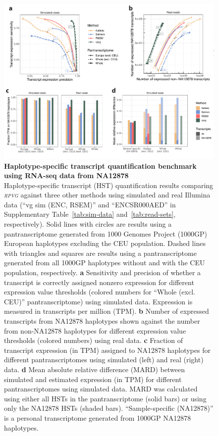 \documentclass[11pt]{ucthesis}
\newcommand{\tool}[1]{\emph{\textsc{#1}}}
\begin{document}
\begin{figure}[h!]
\begin{center}
\includegraphics[width=.85\textwidth]{mpmapfigures/figure3.pdf}
\caption{\textbf{Haplotype-specific transcript quantification benchmark using RNA-seq data from NA12878} \\
Haplotype-specific transcript (HST) quantification results comparing \tool{rpvg} against three other methods using simulated and real Illumina data (``vg sim (ENC, RSEM)'' and ``ENCSR000AED'' in Supplementary Table~\ref{tab:sim-data} and~\ref{tab:read-sets}, respectively). Solid lines with circles are results using a pantranscriptome generated from 1000 Genomes Project (1000GP) European haplotypes excluding the CEU population. Dashed lines with triangles and squares are results using a pantranscriptome generated from all 1000GP haplotypes without and with the CEU population, respectively. \textbf{a} Sensitivity and precision of whether a transcript is correctly assigned nonzero expression for different expression value thresholds (colored numbers for ``Whole (excl. CEU)'' pantranscriptome) using simulated data. Expression is measured in transcripts per million (TPM). \textbf{b} Number of expressed transcripts from NA12878 haplotypes shown against the number from non-NA12878 haplotypes for different expression value thresholds (colored numbers) using real data. \textbf{c} Fraction of transcript expression (in TPM) assigned to NA12878 haplotypes for different pantranscriptomes using simulated (left) and real (right) data. \textbf{d} Mean absolute relative difference (MARD) between simulated and estimated expression (in TPM) for different pantranscriptomes using simulated data. MARD was calculated using either all HSTs in the pantranscriptome (solid bars) or using only the NA12878 HSTs (shaded bars). ``Sample-specific (NA12878)'' is a personal transcriptome generated from 1000GP NA12878 haplotypes.  
} \label{fig:expression}
\end{center}
\end{figure}
\end{document}
